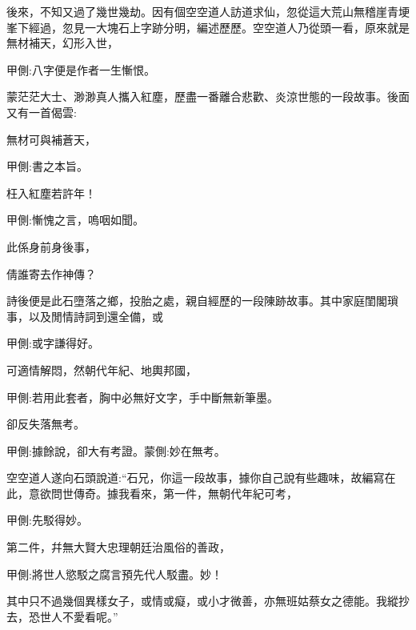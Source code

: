 \begin{parag}
    後來，不知又過了幾世幾劫。因有個空空道人訪道求仙，忽從這大荒山無稽崖青埂峯下經過，忽見一大塊石上字跡分明，編述歷歷。空空道人乃從頭一看，原來就是無材補天，幻形入世，\begin{note}甲側:八字便是作者一生慚恨。\end{note}蒙茫茫大士、渺渺真人攜入紅塵，歷盡一番離合悲歡、炎涼世態的一段故事。後面又有一首偈雲:
\end{parag}


\begin{poem}
    \begin{pl} 無材可與補蒼天，\end{pl}\begin{note}甲側:書之本旨。\end{note}

    \begin{pl} 枉入紅塵若許年！\end{pl}\begin{note}甲側:慚愧之言，嗚咽如聞。\end{note}

    \begin{pl} 此係身前身後事，\end{pl}

    \begin{pl} 倩誰寄去作神傳？\end{pl}
\end{poem}


\begin{parag}
    詩後便是此石墮落之鄉，投胎之處，親自經歷的一段陳跡故事。其中家庭閨閣瑣事，以及閒情詩詞到還全備，或\begin{note}甲側:或字謙得好。\end{note}可適情解悶，然朝代年紀、地輿邦國，\begin{note}甲側:若用此套者，胸中必無好文字，手中斷無新筆墨。\end{note}卻反失落無考。\begin{note}甲側:據餘說，卻大有考證。蒙側:妙在無考。\end{note}
\end{parag}


\begin{parag}
    空空道人遂向石頭說道:“石兄，你這一段故事，據你自己說有些趣味，故編寫在此，意欲問世傳奇。據我看來，第一件，無朝代年紀可考，\begin{note}甲側:先駁得妙。\end{note}第二件，幷無大賢大忠理朝廷治風俗的善政，\begin{note}甲側:將世人慾駁之腐言預先代人駁盡。妙！\end{note}其中只不過幾個異樣女子，或情或癡，或小才微善，亦無班姑蔡女之德能。我縱抄去，恐世人不愛看呢。”
\end{parag}


